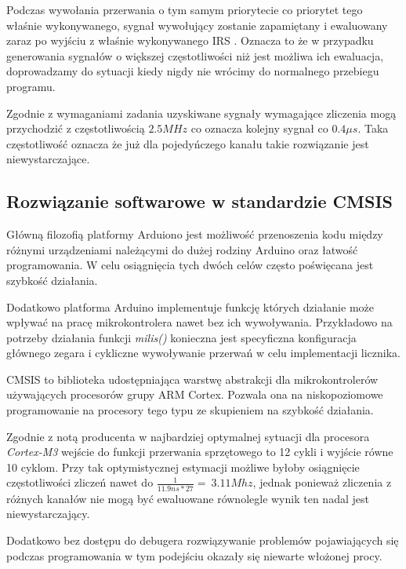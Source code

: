 \documentclass[a4paper,12pt]{article}
\begin{document}
Podczas wywołania przerwania o tym samym priorytecie co priorytet tego właśnie wykonywanego, sygnał wywołujący zostanie zapamiętany i ewaluowany zaraz po wyjściu z właśnie wykonywanego IRS  \cite{datasheet}. 
Oznacza to że w przypadku generowania sygnałów o większej częstotliwości niż jest możliwa ich ewaluacja, doprowadzamy do sytuacji kiedy nigdy nie wrócimy do normalnego przebiegu programu. 

Zgodnie z wymaganiami zadania uzyskiwane sygnały wymagające zliczenia mogą przychodzić z częstotliwością $2.5MHz$ co oznacza kolejny sygnał co $0.4\mu s$.
Taka częstotliwość oznacza że już dla pojedyńczego kanału takie rozwiązanie jest niewystarczające. 

\subsection{Rozwiązanie softwarowe w standardzie CMSIS}
Główną filozofią platformy Arduiono jest możliwość przenoszenia kodu między różnymi urządzeniami należącymi do dużej rodziny Arduino oraz łatwość programowania.
W celu osiągnięcia tych dwóch celów często poświęcana jest szybkość działania. 

Dodatkowo platforma Arduino implementuje funkcję których działanie może wpływać na pracę mikrokontrolera nawet bez ich wywoływania. 
Przykładowo na potrzeby działania funkcji \textit{milis()} konieczna jest specyficzna konfiguracja głównego zegara i cykliczne wywoływanie przerwań w celu implementacji licznika.  


CMSIS to biblioteka udostępniająca warstwę abstrakcji dla mikrokontrolerów używających procesorów grupy ARM Cortex. 
Pozwala ona na niskopoziomowe programowanie na procesory tego typu ze skupieniem na szybkość działania.

Zgodnie z notą producenta \cite{interupt latency} w najbardziej optymalnej sytuacji dla procesora \textit{Cortex-M3} wejście do funkcji przerwania sprzętowego to 12 cykli i wyjście równe 10 cyklom. 
Przy tak optymistycznej estymacji możliwe byłoby osiągnięcie częstotliwości zliczeń nawet do $\frac{1}{11.9ns*27} = ~ 3.11 Mhz$, jednak ponieważ zliczenia z różnych kanałów nie mogą być ewaluowane równolegle wynik ten nadal jest niewystarczający. 

Dodatkowo bez dostępu do debugera rozwiązywanie problemów pojawiających się podczas programowania w tym podejściu okazały się niewarte włożonej procy. 
\end{document}
